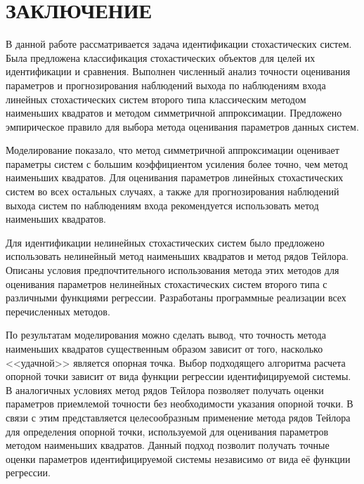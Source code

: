 \chapter*{ЗАКЛЮЧЕНИЕ}

В данной работе рассматривается задача идентификации стохастических систем.
Была предложена классификация стохастических объектов для целей
их идентификации и сравнения.
Выполнен численный анализ точности оценивания параметров и прогнозирования
наблюдений выхода по наблюдениям входа линейных стохастических систем второго типа
классическим методом наименьших квадратов и методом симметричной аппроксимации.
Предложено эмпирическое правило для выбора метода оценивания параметров данных систем.

Моделирование показало, что метод симметричной аппроксимации оценивает параметры систем
с большим коэффициентом усиления более точно, чем метод наименьших квадратов.
Для оценивания параметров линейных стохастических систем во всех остальных случаях,
а также для прогнозирования наблюдений выхода систем по наблюдениям входа
рекомендуется использовать метод наименьших квадратов.

Для идентификации нелинейных стохастических систем было предложено
использовать нелинейный метод наименьших квадратов и метод рядов Тейлора.
Описаны условия предпочтительного использования метода этих методов
для оценивания параметров нелинейных стохастических систем
второго типа с различными функциями регрессии.
Разработаны программные реализации всех перечисленных методов.

По результатам моделирования можно сделать вывод,
что точность метода наименьших квадратов существенным образом
зависит от того, насколько <<удачной>> является опорная точка.
Выбор подходящего алгоритма расчета опорной точки зависит от вида функции
регрессии идентифицируемой системы.
В аналогичных условиях метод рядов Тейлора позволяет получать оценки параметров
приемлемой точности без необходимости указания опорной точки.
В связи с этим представляется целесообразным применение метода рядов Тейлора
для определения опорной точки, используемой для оценивания параметров методом
наименьших квадратов.
Данный подход позволит получать точные оценки параметров идентифицируемой системы
независимо от вида её функции регрессии.
